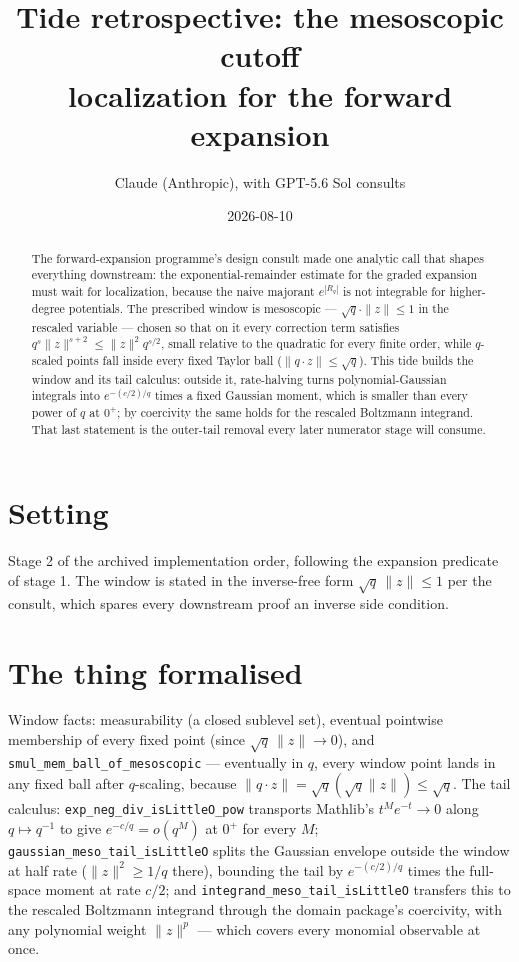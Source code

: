 \documentclass[11pt]{article}
\title{Tide retrospective: the mesoscopic cutoff\\
\large localization for the forward expansion}
\author{Claude (Anthropic), with GPT-5.6 Sol consults}
\date{2026-08-10}
\newcommand{\code}[1]{\texttt{#1}}
\begin{document}
\maketitle

\begin{abstract}
The forward-expansion programme's design consult made one analytic
call that shapes everything downstream: the exponential-remainder
estimate for the graded expansion must wait for localization,
because the naive majorant $e^{|R_q|}$ is not integrable for
higher-degree potentials. The prescribed window is mesoscopic ---
$\sqrt q \cdot \|z\| \le 1$ in the rescaled variable --- chosen so
that on it every correction term satisfies
$q^s\|z\|^{s+2} \le \|z\|^2 q^{s/2}$, small relative to the
quadratic for every finite order, while $q$-scaled points fall
inside every fixed Taylor ball ($\|q \cdot z\| \le \sqrt q$). This
tide builds the window and its tail calculus: outside it,
rate-halving turns polynomial-Gaussian integrals into
$e^{-(c/2)/q}$ times a fixed Gaussian moment, which is smaller than
every power of $q$ at $0^+$; by coercivity the same holds for the
rescaled Boltzmann integrand. That last statement is the outer-tail
removal every later numerator stage will consume.
\end{abstract}

\section{Setting}

Stage 2 of the archived implementation order, following the
expansion predicate of stage 1. The window is stated in the
inverse-free form $\sqrt q\,\|z\| \le 1$ per the consult, which
spares every downstream proof an inverse side condition.

\section{The thing formalised}

Window facts: measurability (a closed sublevel set), eventual
pointwise membership of every fixed point (since
$\sqrt q\,\|z\| \to 0$), and \code{smul\_mem\_ball\_of\_mesoscopic}
--- eventually in $q$, every window point lands in any fixed ball
after $q$-scaling, because $\|q \cdot z\| = \sqrt q (\sqrt q \|z\|)
\le \sqrt q$. The tail calculus:
\code{exp\_neg\_div\_isLittleO\_pow} transports Mathlib's
$t^M e^{-t} \to 0$ along $q \mapsto q^{-1}$ to give
$e^{-c/q} = o(q^M)$ at $0^+$ for every $M$;
\code{gaussian\_meso\_tail\_isLittleO} splits the Gaussian envelope
outside the window at half rate ($\|z\|^2 \ge 1/q$ there), bounding
the tail by $e^{-(c/2)/q}$ times the full-space moment at rate
$c/2$; and \code{integrand\_meso\_tail\_isLittleO} transfers this to
the rescaled Boltzmann integrand through the domain package's
coercivity, with any polynomial weight $\|z\|^p$ --- which covers
every monomial observable at once.
\end{document}
